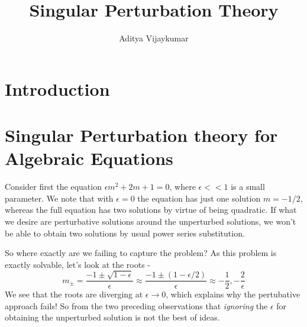 \documentclass[a4paper,11pt]{article}
\title{\textbf{Singular Perturbation Theory}}
\author{Aditya Vijaykumar}
\affiliation{International Centre for Theoretical Sciences, Bengaluru, India.}
\begin{document}
\maketitle
\section{Introduction}
\section{Singular Perturbation theory for Algebraic Equations}
Consider first the equation $ \epsilon m^2 + 2m + 1 =0 $, where $ \epsilon << 1 $ is a small parameter. We note that with $ \epsilon= 0$ the equation has just one solution $ m = -1/2 $, whereas the full equation has two solutions by virtue of being quadratic. If what we desire are perturbative solutions around the unperturbed solutions, we won't be able to obtain two solutions by usual power series substitution.

So where exactly are we failing to capture the problem? As this problem is exactly solvable, let's look at the roots -
\begin{equation*}
m_\pm = \dfrac{-1 \pm \sqrt{1 - \epsilon}}{\epsilon} \approx\dfrac{-1 \pm (1 - \epsilon/2)}{\epsilon} \approx -\dfrac{1}{2}, - \dfrac{2}{\epsilon}
\end{equation*}
We see that the roots are diverging at $ \epsilon \rightarrow 0 $, which explains why the pertubative approach fails! So  from the two preceding observations that \textit{ignoring} the $ \epsilon $ for obtaining the unperturbed solution is not the best of ideas. 
\end{document}
